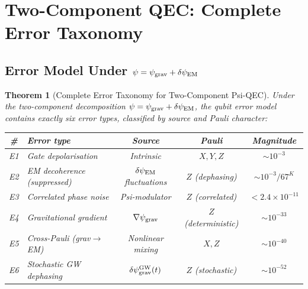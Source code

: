 \documentclass[11pt]{article}
\newtheorem{theorem}{Theorem}[section]
\theoremstyle{definition}
\theoremstyle{remark}
\newcommand{\ee}[1]{\times 10^{#1}}
\newcommand{\psigrav}{\psi_{\rm grav}}
\newcommand{\dpsiEM}{\delta\psi_{\rm EM}}
\begin{document}
\section{Two-Component QEC: Complete Error Taxonomy}
\label{sec:two-component-qec}

\subsection{Error Model Under $\psi = \psigrav + \dpsiEM$}
\label{sec:error-taxonomy}

\begin{theorem}[Complete Error Taxonomy for Two-Component Psi-QEC]
\label{thm:error-taxonomy}
Under the two-component decomposition $\psi = \psigrav + \dpsiEM$,
the qubit error model contains exactly six error types, classified
by source and Pauli character:

\begin{center}
\begin{tabular}{@{}clccc@{}}
\toprule
\# & Error type & Source & Pauli & Magnitude \\
\midrule
E1 & Gate depolarisation & Intrinsic & $X, Y, Z$ & $\sim 10^{-3}$ \\
E2 & EM decoherence (suppressed) & $\dpsiEM$ fluctuations &
  $Z$ (dephasing) & $\sim 10^{-3}/67^K$ \\
E3 & Correlated phase noise & Psi-modulator & $Z$ (correlated) &
  $< 2.4\ee{-11}$ \\
E4 & Gravitational gradient & $\nabla\psigrav$ & $Z$ (deterministic) &
  $\sim 10^{-33}$ \\
E5 & Cross-Pauli (grav$\to$EM) & Nonlinear mixing & $X, Z$ &
  $\sim 10^{-40}$ \\
E6 & Stochastic GW dephasing & $\delta\psigrav^{\rm GW}(t)$ & $Z$
  (stochastic) & $\sim 10^{-52}$ \\
\bottomrule
\end{tabular}
\end{center}
\end{theorem}
\end{document}
